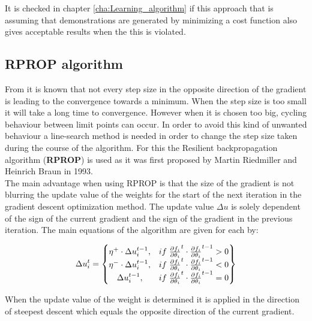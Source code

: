 It is checked in chapter \ref{cha:Learning_algorithm} if this approach that is assuming that demonstrations are generated by minimizing a cost function also gives acceptable results when the this is violated.

\subsection{RPROP algorithm}
From \cite{Panos_opti} it is known that not every step size in the opposite direction of the gradient is leading to the convergence towards a minimum. When the step size is too small it will take a long time to convergence. However when it is chosen too big, cycling behaviour between limit points can occur. In order to avoid this kind of unwanted behaviour a line-search method is needed in order to change the step size taken during the course of the algorithm. For this the Resilient backpropagation algorithm (\textbf{RPROP}) \cite{RPROP} is used as it was first proposed by Martin Riedmiller and Heinrich Braun in 1993.\\

The main advantage when using RPROP is that the size of the gradient is not blurring the update value of the weights for the start of the next iteration in the gradient descent optimization method. The update value $\Delta u$ is solely dependent of the sign of the current gradient and the sign of the gradient in the previous iteration. The main equations of the algorithm are given for each by: 

\begin{equation}\label{eq:7}
	\Delta u^t_i =
	\begin{Bmatrix}
		 \eta^+ \cdot \Delta u^{t-1}_i, & if \hspace{1 mm} \pdv{f_i}{\theta_i}^t \cdot \pdv{f_i}{\theta_i}^{t-1} > 0 \\
		 \eta^- \cdot \Delta u^{t-1}_i, & if \hspace{1 mm} \pdv{f_i}{\theta_i}^t \cdot \pdv{f_i}{\theta_i}^{t-1} < 0 \\
		  \Delta u^{t-1}_i, & if \hspace{1 mm} \pdv{f_i}{\theta_i}^t \cdot \pdv{f_i}{\theta_i}^{t-1} = 0 \\
	\end{Bmatrix}
\end{equation}

When the update value of the weight is determined it is applied in the direction of steepest descent which equals the opposite direction of the current gradient. 

